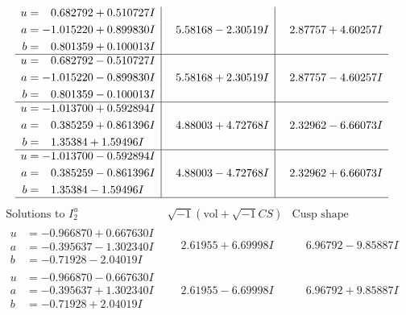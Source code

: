 \documentclass[1p]{elsarticle_modified}
\theoremstyle{definition}
\newcommand{\I}{\sqrt{-1}}
\begin{document}
$$\begin{array}{c|c|c}
\begin{aligned}
u &= \phantom{-}0.682792 + 0.510727 I \\
a &= -1.015220 + 0.899830 I \\
b &= \phantom{-}0.801359 + 0.100013 I\end{aligned}
 & \phantom{-}5.58168 - 2.30519 I & \phantom{-}2.87757 + 4.60257 I \\ \hline\begin{aligned}
u &= \phantom{-}0.682792 - 0.510727 I \\
a &= -1.015220 - 0.899830 I \\
b &= \phantom{-}0.801359 - 0.100013 I\end{aligned}
 & \phantom{-}5.58168 + 2.30519 I & \phantom{-}2.87757 - 4.60257 I \\ \hline\begin{aligned}
u &= -1.013700 + 0.592894 I \\
a &= \phantom{-}0.385259 + 0.861396 I \\
b &= \phantom{-}1.35384 + 1.59496 I\end{aligned}
 & \phantom{-}4.88003 + 4.72768 I & \phantom{-}2.32962 - 6.66073 I \\ \hline\begin{aligned}
u &= -1.013700 - 0.592894 I \\
a &= \phantom{-}0.385259 - 0.861396 I \\
b &= \phantom{-}1.35384 - 1.59496 I\end{aligned}
 & \phantom{-}4.88003 - 4.72768 I & \phantom{-}2.32962 + 6.66073 I\\
 \hline 
 \end{array}$$\newpage$$\begin{array}{c|c|c}  
\text{Solutions to }I^u_{2}& \I (\text{vol} + \sqrt{-1}CS) & \text{Cusp shape}\\
 \hline 
\begin{aligned}
u &= -0.966870 + 0.667630 I \\
a &= -0.395637 - 1.302340 I \\
b &= -0.71928 - 2.04019 I\end{aligned}
 & \phantom{-}2.61955 + 6.69998 I & \phantom{-}6.96792 - 9.85887 I \\ \hline\begin{aligned}
u &= -0.966870 - 0.667630 I \\
a &= -0.395637 + 1.302340 I \\
b &= -0.71928 + 2.04019 I\end{aligned}
 & \phantom{-}2.61955 - 6.69998 I & \phantom{-}6.96792 + 9.85887 I \\ \hline\begin{aligned}

\end{aligned}
\end{array}$$
\end{document}
